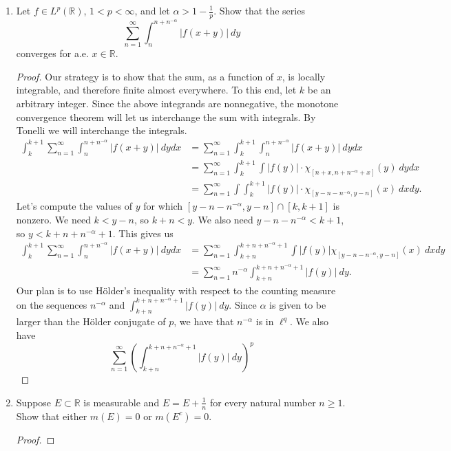 \documentclass[11pt,letterpaper]{report}
\newcommand{\reals}{\mathbb{R}}
\begin{document}
\begin{enumerate}
	\item Let $f\in L^p(\reals)$, $1<p<\infty$, and let $\alpha>1-\frac{1}{p}$. Show that the series
	\[
	\sum_{n=1}^\infty \int_n^{n+n^{-\alpha}}|f(x+y)|\ dy
	\]
	converges for a.e. $x\in \reals$.
	\begin{proof}
		Our strategy is to show that the sum, as a function of $x$, is locally integrable, and therefore finite almost everywhere. To this end, let $k$ be an arbitrary integer. Since the above integrands are nonnegative, the monotone convergence theorem will let us interchange the sum with integrals. By Tonelli we will interchange the integrals.
		\begin{align*}
			\int_k^{k+1}\sum_{n=1}^\infty \int_n^{n+n^{-\alpha}}|f(x+y)|\ dydx &= \sum_{n=1}^\infty \int_k^{k+1}\int_n^{n+n^{-\alpha}}|f(x+y)|\ dydx\\
			&= \sum_{n=1}^\infty \int_k^{k+1}\int|f(y)|\cdot \chi_{[n+x, n+n^{-\alpha}+x]}(y)\ dydx\\
			&= \sum_{n=1}^\infty \int\int_k^{k+1}|f(y)|\cdot \chi_{[y-n-n^{-\alpha}, y-n]}(x)\ dxdy.
		\end{align*}
		Let's compute the values of $y$ for which $[y-n-n^{-\alpha}, y-n]\cap [k, k+1]$ is nonzero. We need $k<y-n$, so $k+n<y$. We also need $y-n-n^{-\alpha}<k+1$, so $y<k+n+n^{-\alpha}+1$. This gives us
		\begin{align*}
			\int_k^{k+1}\sum_{n=1}^\infty \int_n^{n+n^{-\alpha}}|f(x+y)|\ dydx &= \sum_{n=1}^\infty \int_{k+n}^{k+n+n^{-\alpha}+1}\int|f(y)|\chi_{[y-n-n^{-\alpha}, y-n]}(x)\ dxdy\\
			&= \sum_{n=1}^\infty n^{-\alpha}\int_{k+n}^{k+n+n^{-\alpha}+1}|f(y)|\ dy.
		\end{align*}
		Our plan is to use H\"older's inequality with respect to the counting measure on the sequences $n^{-\alpha}$ and $\int_{k+n}^{k+n+n^{-\alpha}+1}|f(y)|\ dy$. Since $\alpha$ is given to be larger than the H\"older conjugate of $p$, we have that $n^{-\alpha}$ is in $\ell^q$. We also have
		\[
		\sum_{n=1}^\infty\left(\int_{k+n}^{k+n+n^{-\alpha}+1}|f(y)|\ dy\right)^p
		\]
	\end{proof}

	\item Suppose $E\subset \reals$ is measurable and $E = E+\frac{1}{n}$ for every natural number $n\geq 1$. Show that either $m(E) = 0$ or $m(E^c) = 0$.
	\begin{proof}
		
	\end{proof}
\end{enumerate}
\end{document}
